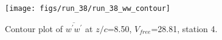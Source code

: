 \begin{figure}[H]
\centering
\texttt{[image: figs/run\_38/run\_38\_ww\_contour]}
\caption{Contour plot of $\overline{w^\prime w^\prime}$ at $z/c$=8.50, $V_{free}$=28.81, station 4.}
\label{fig:run_38_ww_contour}
\end{figure}


